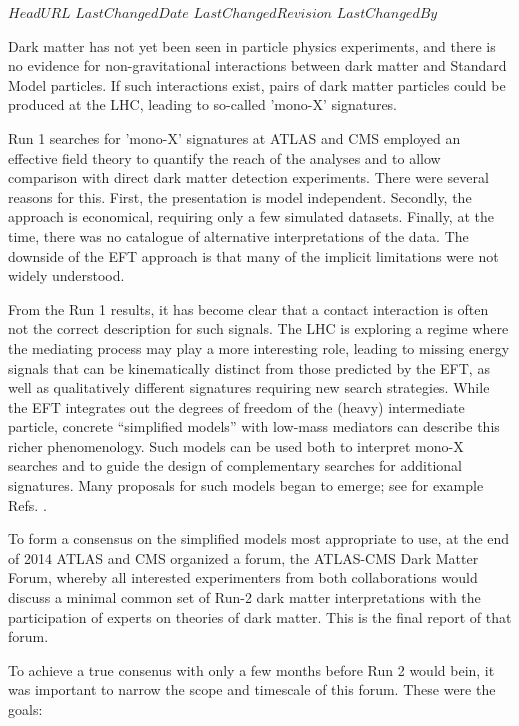\svnidlong
{$HeadURL$}
{$LastChangedDate$}
{$LastChangedRevision$}
{$LastChangedBy$}

Dark matter has not yet been seen in particle physics experiments, and
there is no evidence for non-gravitational interactions between dark
matter and Standard Model particles.  If such interactions exist,
pairs of dark matter particles could be produced at the LHC, leading
to so-called 'mono-X' signatures.

Run 1 searches for 'mono-X' signatures at ATLAS and CMS employed an
effective field theory \cite{Goodman:2010ku} to quantify the reach of
the analyses and to allow comparison with direct dark matter detection
experiments. There were several reasons for this.  First, the
presentation is model independent.  Secondly, the approach is
economical, requiring only a few simulated datasets.  Finally, at the
time, there was no catalogue of alternative interpretations of the
data. The downside of the EFT approach is that many of the implicit
limitations were not widely understood.

From the Run 1 results, it has become clear \cite{Busoni:2013lha} that
a contact interaction is often not the correct description for such
signals. The LHC is exploring a regime where the mediating process may
play a more interesting role, leading to missing energy signals that
can be kinematically distinct from those predicted by the EFT, as well
as qualitatively different signatures requiring new search
strategies. While the EFT integrates out the degrees of freedom of the
(heavy) intermediate particle, concrete ``simplified models'' with
low-mass mediators \cite{Alves:2011wf} can describe this richer
phenomenology. Such models can be used both to interpret mono-­X
searches and to guide the design of complementary searches for
additional signatures. Many proposals for such models began to emerge;
see for example
Refs. \cite{Tait:2013,Buchmueller:2013dya,Yavin:14092893,Malik:2014ggr,Harris:2014hga,Buckley:2014fba}.

To form a consensus on the simplified models most appropriate to use,
at the end of 2014 ATLAS and CMS organized a forum, the ATLAS-­CMS
Dark Matter Forum, whereby all interested experimenters from both
collaborations would discuss a minimal common set of Run-2 dark matter
interpretations with the participation of experts on theories of dark
matter. This is the final report of that forum.

To achieve a true consenus with only a few months before Run 2 would
bein, it was important to narrow the scope and timescale of this
forum. These were the goals:

